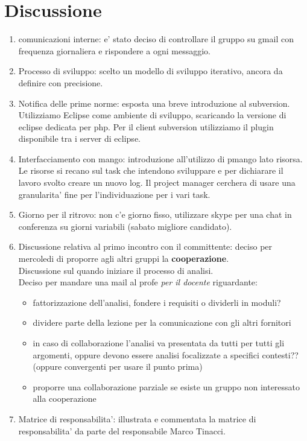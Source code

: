 \section*{Discussione}
\begin{enumerate}
\item comunicazioni interne: e' stato deciso di controllare il gruppo su gmail
con frequenza giornaliera e rispondere a ogni messaggio.
\item Processo di sviluppo: scelto un modello di sviluppo iterativo, ancora da
definire con precisione.
\item Notifica delle prime norme: esposta una breve introduzione al subversion. 
Utilizziamo Eclipse come ambiente di sviluppo, scaricando la versione di eclipse
dedicata per php. Per il client subversion utilizziamo il plugin disponibile 
tra i server di eclipse.
\item Interfacciamento con mango: introduzione all'utilizzo di pmango lato 
risorsa. Le risorse si recano sul task che intendono
sviluppare e per dichiarare il lavoro svolto creare un nuovo log.
Il project manager cerchera di usare una granularita' fine per l'individuazione 
per i vari task.
\item Giorno per il ritrovo: non c'e giorno fisso, utilizzare skype per una chat 
in conferenza su giorni variabili (sabato migliore candidato). 
\item Discussione relativa al primo incontro con il committente: 
deciso per mercoledi di proporre agli altri gruppi la \textbf{cooperazione}. \\
Discussione sul quando iniziare il processo di analisi. \\
Deciso per mandare una mail al profe \emph{per il docente} riguardante:
\label{ver:quesito_coop_gruppi}
\begin{itemize}
\item fattorizzazione dell'analisi, fondere i requisiti o dividerli in moduli?
\item dividere parte della lezione per la comunicazione con gli altri fornitori
\item in caso di collaborazione l'analisi va presentata da tutti per tutti gli
argomenti, oppure devono essere analisi focalizzate a specifici contesti?? 
(oppure convergenti per usare il punto prima)
\item proporre una collaborazione parziale se esiste un gruppo non interessato 
alla cooperazione
\end{itemize}
\item Matrice di responsabilita': illustrata e commentata la matrice di 
responsabilita' da parte del responsabile Marco Tinacci.
\end{enumerate}

